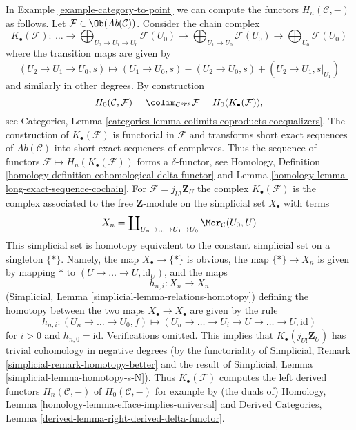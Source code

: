 \begin{example}
\label{example-left-derived-colimits}
In Example \ref{example-category-to-point} we can compute
the functors $H_n(\mathcal{C}, -)$ as follows. Let
$\mathcal{F} \in \Ob(\textit{Ab}(\mathcal{C}))$.
Consider the chain complex
$$
K_\bullet(\mathcal{F}) :
\ \ldots \to
\bigoplus\nolimits_{U_2 \to U_1 \to U_0} \mathcal{F}(U_0)
\to
\bigoplus\nolimits_{U_1 \to U_0} \mathcal{F}(U_0)
\to
\bigoplus\nolimits_{U_0} \mathcal{F}(U_0)
$$
where the transition maps are given by
$$
(U_2 \to U_1 \to U_0, s)
\longmapsto
(U_1 \to U_0, s) - (U_2 \to U_0, s) + (U_2 \to U_1, s|_{U_1})
$$
and similarly in other degrees. By construction
$$
H_0(\mathcal{C}, \mathcal{F}) =
\colim_{\mathcal{C}^{opp}} \mathcal{F} =
H_0(K_\bullet(\mathcal{F})),
$$
see Categories, Lemma \ref{categories-lemma-colimits-coproducts-coequalizers}.
The construction of $K_\bullet(\mathcal{F})$ is functorial in $\mathcal{F}$
and transforms short exact sequences of $\textit{Ab}(\mathcal{C})$ into
short exact sequences of complexes. Thus the sequence of functors
$\mathcal{F} \mapsto H_n(K_\bullet(\mathcal{F}))$ forms a $\delta$-functor, see
Homology, Definition \ref{homology-definition-cohomological-delta-functor} and
Lemma \ref{homology-lemma-long-exact-sequence-cochain}.
For $\mathcal{F} = j_{U!}\mathbf{Z}_U$ the complex $K_\bullet(\mathcal{F})$
is the complex associated to the free $\mathbf{Z}$-module on the simplicial
set $X_\bullet$ with terms
$$
X_n = \coprod\nolimits_{U_n \to \ldots \to U_1 \to U_0}
\Mor_\mathcal{C}(U_0, U)
$$
This simplicial set is homotopy equivalent to the constant simplicial
set on a singleton $\{*\}$. Namely, the map $X_\bullet \to \{*\}$
is obvious, the map $\{*\} \to X_n$ is given
by mapping $*$ to $(U \to \ldots \to U, \text{id}_U)$, and the
maps
$$
h_{n, i} : X_n \longrightarrow X_n
$$
(Simplicial, Lemma \ref{simplicial-lemma-relations-homotopy})
defining the homotopy between the two maps $X_\bullet \to X_\bullet$
are given by the rule
$$
h_{n, i} :
(U_n \to \ldots \to U_0, f)
\longmapsto
(U_n \to \ldots \to U_i \to U \to \ldots \to U, \text{id})
$$
for $i > 0$ and $h_{n, 0} = \text{id}$. Verifications omitted.
This implies that $K_\bullet(j_{U!}\mathbf{Z}_U)$ has trivial
cohomology in negative degrees
(by the functoriality of
Simplicial, Remark \ref{simplicial-remark-homotopy-better}
and the result of
Simplicial, Lemma \ref{simplicial-lemma-homotopy-s-N}).
Thus $K_\bullet(\mathcal{F})$ computes the left derived functors
$H_n(\mathcal{C}, -)$ of $H_0(\mathcal{C}, -)$
for example by (the duals of)
Homology, Lemma \ref{homology-lemma-efface-implies-universal}
and
Derived Categories, Lemma \ref{derived-lemma-right-derived-delta-functor}.
\end{example}

